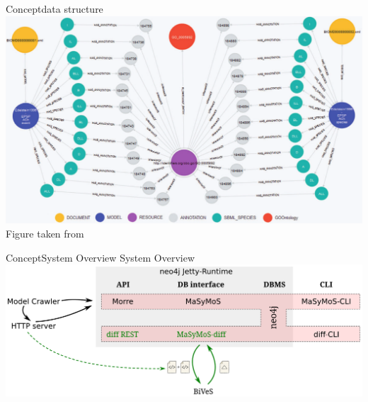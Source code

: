 \begin{frame}{Concept}{\masymos data structure}
	\centering
	\includegraphics[width=\linewidth,height=\textheight,keepaspectratio]{./figures/masymos-small.png}\\
	{\small Figure taken from \citealt{Henkel2015}}
\end{frame}

\begin{frame}{Concept}{System Overview}
	{\LARGE System Overview}
	\\[2.5em]
	\centering
	\vfill
	\includegraphics[width=\linewidth,height=\textheight,keepaspectratio]{../tex/resources/system-overview-matrix.pdf}
	\vfill
\end{frame}


